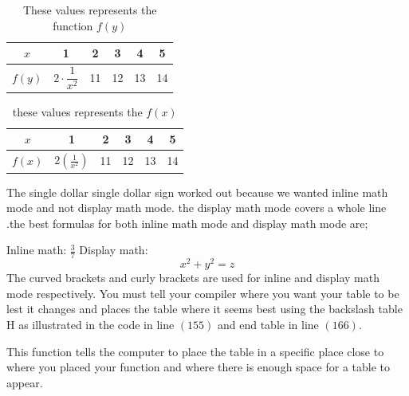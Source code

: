 \documentclass[a4paper,12pt]{article}
\begin{document}
  		 
  		 
  		 
  		 
  		 \vspace{30pt}
  		 
  		 
  		 
  		 
  		 
  		 
  		 \begin{table}
  		 	\centering
  		 	 \caption{These values represents the function $f(y)$}
  		\def\arraystretch{2.4}
  		  \begin{tabular}{|c||c|c|c|c|c|}
  		 	\hline
  		 	$x$ & 1 & 2 & 3 & 4 & 5\\ \hline
  		 	$f(y)$ & $2\cdot \dfrac{1}{x^2} $ & 11 & 12 & 13 & 14\\ \hline
  		 \end{tabular}
  		 \end{table}
  		 
  		 \vspace{40pt}
  		 
  		 
  		 
  		 
  		 
  		 
  		 \def\arraystretch{2.5}
  		 \begin{table}
  		 \centering
  		 \begin{tabular}{|c||c|c|c|c|c|}
  		 	\hline
  		 	
  		 	$x$ & 1 & 2 & 3 & 4 & 5\\ \hline
  		 	$f(x)$ & $2\displaystyle\left(\frac{1}{x^2}\right)$ & 11 & 12 & 13 & 14\\ \hline
  		 	\end{tabular}
  		 	\caption{these values represents the $f(x)$}
  		 	\end{table}
  		 The single dollar single dollar sign worked out because we wanted inline math mode and not display math mode. the display math mode covers a whole line .the best formulas for both inline math mode and display math mode are; 
  		 
  		 Inline math: \(\frac{3}{7}  \)
  		   		 Display math: \[x^2 +y^2 = z  \]The curved brackets and curly brackets are used for inline and display math mode respectively.
  		 You must tell your compiler where you want your table to be lest it changes and places the table where it seems best using the backslash table H as illustrated in the code in line  \(\left(155\right)\) and end table in line \(\left(166\right)\). 
  		 
  		 This function tells the computer to place the table in a specific place close to where you placed your function and where there is enough space for a table to appear.
  		 
\end{document}
